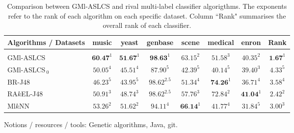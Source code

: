 \begin{table}[!h]
  \begin{center}
    \begin{tabular}{l|cccccc|c}
    Algorithms / Datasets& music     & yeast     & genbase       & scene     & medical   & enron     & Rank \\
    \hline \\ [-2ex]
    GMl-ASLCS         & $\textbf{60.47}^1$ & $\textbf{51.67}^1$ & $\textbf{98.63}^1$  & $63.15^2$ & $51.58^3$ & $40.35^2$ & $\textbf{1.67}^1$  \\
    GMl-ASLCS$_{\:0}$ & $50.05^4$ & $45.51^4$ & $87.90^5$     & $42.39^5$ & $40.14^5$ & $39.40^3$ & $4.33^5$      \\
    BR-J48            & $46.23^5$ & $43.95^5$ & $98.62^{2.5}$ & $51.34^4$ & $\textbf{74.26}^1$ & $36.71^4$ & $3.58^4$    \\
    RA$k$EL-J48       & $50.91^3$ & $48.74^3$ & $98.62^{2.5}$ & $57.76^3$ & $72.84^2$ & $\textbf{41.04}^1$ & $2.42^2$      \\
    Ml$k$NN           & $53.26^2$ & $51.62^2$ & $94.11^4$     & $\textbf{66.14}^1$ & $41.77^4$ & $31.84^5$ & $3.00^3$
    \\
    \end{tabular}
    \caption{Comparison between GMl-ASLCS and rival multi-label classifier algorigthms.
    The exponents refer to the rank of each algorithm on each specific dataset.
    Column ``Rank" summarises the overall rank of each classifier.}
	\label{table:accuracyBasedComparison}
    \end{center}
\end{table}

Notions / resources / tools: Genetic algorithms, Java, git.

